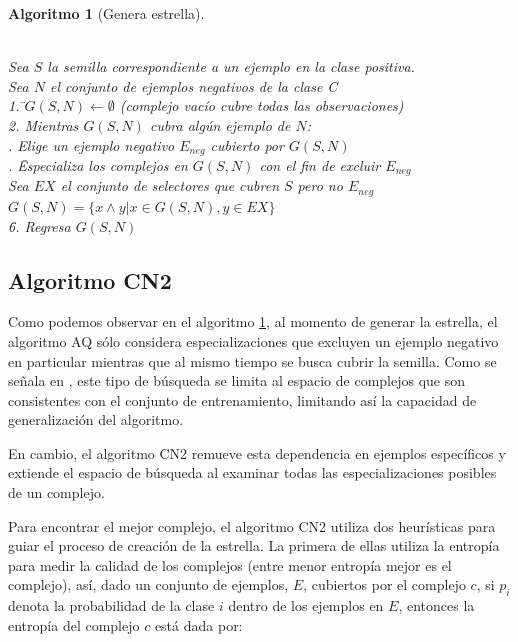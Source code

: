 \documentclass[12pt]{scrbook}
\theoremstyle{break}
\theoremstyle{break}
\newtheorem{algoritmo}{Algoritmo}[chapter]
\begin{document}
\begin{algoritmo}[Genera estrella]
\begin{tabbing}
\\Sea $S$ la semilla correspondiente a un ejemplo en la clase positiva.
\\Sea $N$ el conjunto de ejemplos negativos de la clase C\\
1. \=$G(S,N)\leftarrow \emptyset$ (complejo vacío cubre todas las observaciones) \\
2. Mientras $G(S,N)$ cubra algún ejemplo de $N$:\\
 . Elige un ejemplo negativo $E_{neg}$ cubierto por $G(S,N)$\\
 . \= Especializa los complejos en $G(S,N)$ con el fin de excluir $E_{neg}$\\
 \> Sea $EX$ el conjunto de selectores que cubren $S$ pero no $E_{neg}$ \\
 \> $G(S,N)=\{x \wedge y \vert x \in G(S,N), y \in EX \}$\\
\=6. Regresa $G(S,N)$
\end{tabbing}
\label{algo:AQ genera estrella}
\end{algoritmo}

\subsection{Algoritmo CN2}
\label{subseccion:algoritmo cn2}
Como podemos observar en el algoritmo \ref{algo:AQ genera estrella}, al momento de generar la estrella, el algoritmo AQ sólo considera especializaciones que excluyen un ejemplo negativo en particular mientras que al mismo tiempo se busca cubrir la semilla. Como se señala en \cite{CN2-Clark1989}, este tipo de búsqueda se limita al espacio de complejos que son consistentes con el conjunto de entrenamiento, limitando así la capacidad de generalización del algoritmo.

En cambio, el algoritmo CN2 remueve esta dependencia en ejemplos específicos y extiende el espacio de búsqueda al examinar todas las especializaciones posibles de un complejo.

Para encontrar el mejor complejo, el algoritmo CN2 utiliza dos heurísticas para guiar el proceso de creación de la estrella. La primera de ellas utiliza la entropía para medir la calidad de los complejos (entre menor entropía mejor es el complejo), así, dado un conjunto de ejemplos, $E$, cubiertos por el complejo $c$, si $p_i$ denota la probabilidad de la clase $i$ dentro de los ejemplos en $E$, entonces la entropía del complejo $c$ está dada por:
\end{document}
